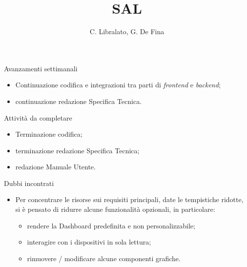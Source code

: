 \documentclass{beamer}
\title{SAL}
\author[C. Libralato, G. De Fina]{C. Libralato, G. De Fina}
\begin{document}
{
\begin{frame}
    \titlepage
\end{frame}
}

\makeMembersFrame

\begin{frame}{Avanzamenti settimanali}
    \begin{itemize}
        \setlength{\itemsep}{0.9em}
        \item Continuazione codifica e integrazioni tra parti di  \textit{frontend} e \textit{backend};
        \item continuazione redazione Specifica Tecnica.
    \end{itemize}
\end{frame}

\makePrecedentTodoFrame

\renewcommand{\precedentTodoEntries}{}


\makePrecedentTodoFrame


\begin{frame}{Attività da completare}
    \begin{itemize}
        \setlength{\itemsep}{0.9em}
        \item Terminazione codifica;
        \item terminazione redazione Specifica Tecnica;
        \item redazione Manuale Utente. 
    \end{itemize}
\end{frame}

\begin{frame}{Dubbi incontrati}
    \begin{itemize}
        \setlength{\itemsep}{0.9em}
        \item Per concentrare le risorse sui requisiti principali, date le tempistiche ridotte, si è pensato di ridurre alcune funzionalità opzionali, in particolare:
        \begin{itemize}
            \item rendere la Dashboard predefinita e non personalizzabile;
            \item interagire con i dispositivi in sola lettura;
            \item rimuovere / modificare alcune componenti grafiche.
        \end{itemize}
    \end{itemize}
\end{frame}
\end{document}
